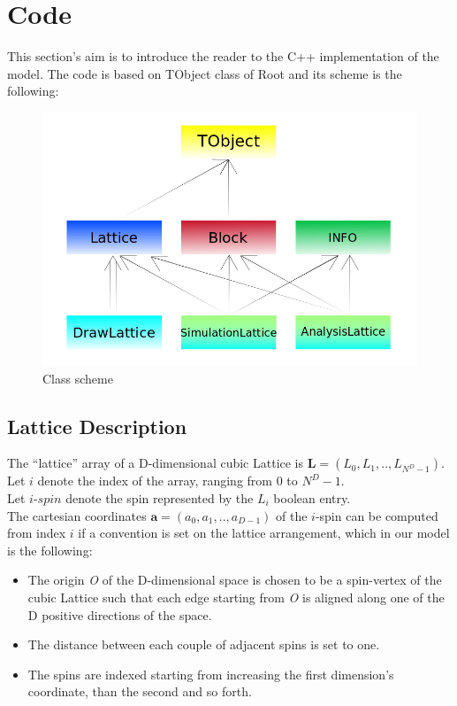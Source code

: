 \documentclass[11pt,a4paper]{article}
\begin{document}
\newpage
\section{Code}
This section's aim is to introduce the reader to the C++ implementation of the model. The code is based on TObject class of Root and its scheme is the following:

\begin{figure}[h!]
  \centering
  \includegraphics[scale=0.45]{img/Schema_classi.png}
  \caption{Class scheme}
\end{figure}




\subsection{Lattice Description}

The “lattice” array of a D-dimensional cubic Lattice is $\mathbf{L} = (L_0,L_1,..,L_{N^D-1})$.
Let $i$ denote the index of the array, ranging from $0$ to $N^D-1$.\\
Let $i$-$spin$ denote the spin represented by the $L_i$ boolean entry. \\
The cartesian coordinates $\mathbf{a} = (a_0,a_1,..,a_{D-1})$ of the $i$-spin can be computed from index $i$ if a convention is set on the lattice arrangement, which in our model is the following:
\begin{itemize}
\item The origin \textit{O} of the D-dimensional space is chosen to be a spin-vertex of the cubic Lattice such that each edge starting from \textit{O} is aligned along one of the D positive directions of the space.
\item The distance between each couple of adjacent spins is set to one.
\item The spins are indexed starting from increasing the first dimension’s coordinate, than the second and so forth.
\end{itemize}
\end{document}
